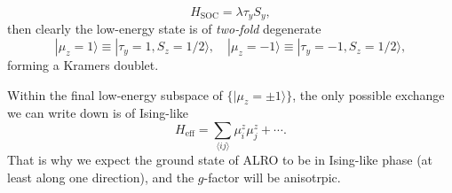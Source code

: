 \documentclass[10pt,nofootinbib,letterpaper]{revtex4}
\begin{document}
		\begin{equation}\label{1.3.4}
			H_{\text{SOC}}=\lambda\tau_yS_y,
		\end{equation}
		then clearly the low-energy state is of \emph{two-fold} degenerate
		\begin{equation}\label{1.3.5}
			|\mu_z=1\rangle\equiv|\tau_y=1,S_z=1/2\rangle,\quad |\mu_z=-1\rangle\equiv|\tau_y=-1,S_z=1/2\rangle,
		\end{equation}
		 forming a Kramers doublet.\par
		 Within the final low-energy subspace of $\{|\mu_z=\pm1\rangle\}$, the only possible exchange we can write down is of Ising-like
		 \begin{equation}\label{1.3.6}
		 	H_{\text{eff}}=\sum_{\langle ij \rangle}\mu_i^z\mu_j^z+\cdots.
		 \end{equation}
		 That is why we expect the ground state of ALRO to be in Ising-like phase (at least along one direction), and the $g$-factor will be anisotrpic.
\end{document}
